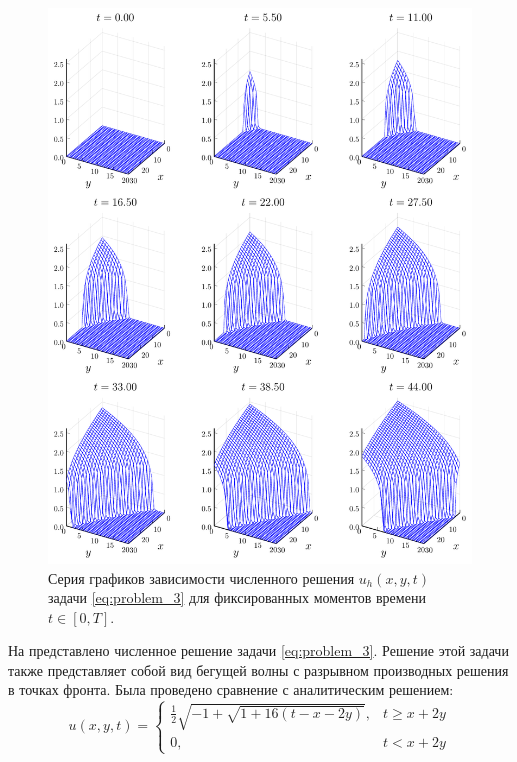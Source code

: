\begin{figure}
    \centering
    \includegraphics[width=\textwidth, keepaspectratio]{Разностные_схемы_на_статических_сетках/Программный_код_примеры_расчётов/explicit_scheme/problem_3_loc_wireframe.pdf}
    \caption{Серия графиков зависимости численного решения $u_h(x, y, t)$ задачи \eqref{eq:problem_3} для фиксированных моментов времени $t \in [0, T]$.}
    \label{fig:problem_3_wireframe}
\end{figure}
На  представлено численное решение задачи \eqref{eq:problem_3}.
Решение этой задачи также представляет собой вид бегущей волны с разрывном производных решения в точках фронта.
Была проведено сравнение с аналитическим решением:
\begin{equation*}
    u(x, y, t) = \begin{cases}
        \frac{1}{2}\sqrt{-1 + \sqrt{1 + 16(t - x - 2y)}}, & t \ge x + 2y\\
        0, & t < x + 2y
    \end{cases}
\end{equation*}
